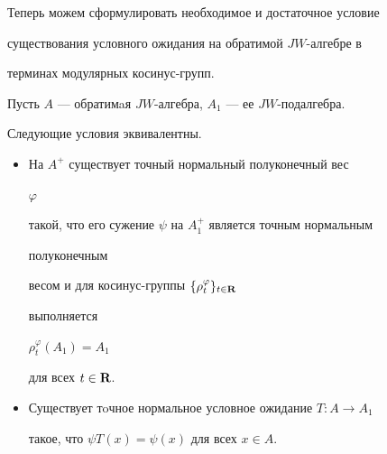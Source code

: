  


Теперь можем сформулировать необходимое и достаточное условие 


существования условного ожидания на обратимой $JW$-алгебре в 


терминах модулярных косинус-групп. 


 


\begin{thm} 


Пусть $A$ --- обратимaя $JW$-алгебра, $A_1$ --- ее $JW$-подалгебра. 


Следующие условия эквивалентны. 


\begin{itemize} 


\item[1)] На $A^+$ существует точный нормальный полуконечный вес 


$\varphi$ 


такой, что его сужение $\psi$ на $A^+_1$ является точным нормальным 


полуконечным 


весом и для косинус-группы $\{\rho^\varphi_t\}_{t\in\bold R}$ 


выполняется 


$\rho^\varphi_t(A_1)=A_1$ 


для всех $t\in\bold R$. 


\item[2)] Существует тoчное нормальное условное ожидание $T:A\to A_1$ 


такое, что $\psi{}T(x)=\psi(x)$ для всех $x\in A$. 


\end{itemize} 


\end{thm} 





